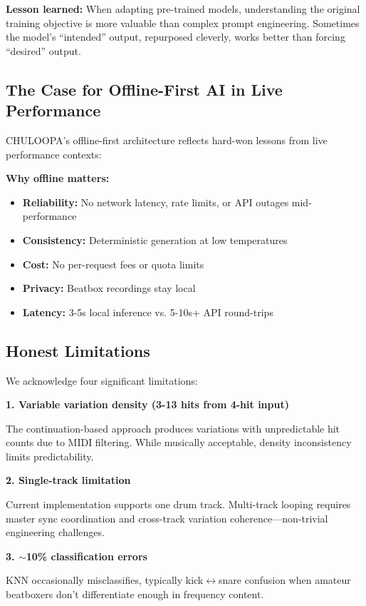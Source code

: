 \documentclass{aimc2026}
\begin{document}
\textbf{Lesson learned:} When adapting pre-trained models, understanding the original training objective is more valuable than complex prompt engineering. Sometimes the model's ``intended'' output, repurposed cleverly, works better than forcing ``desired'' output.

\subsection{The Case for Offline-First AI in Live Performance}

CHULOOPA's offline-first architecture reflects hard-won lessons from live performance contexts:

\textbf{Why offline matters:}
\begin{itemize}
\item \textbf{Reliability:} No network latency, rate limits, or API outages mid-performance
\item \textbf{Consistency:} Deterministic generation at low temperatures
\item \textbf{Cost:} No per-request fees or quota limits
\item \textbf{Privacy:} Beatbox recordings stay local
\item \textbf{Latency:} 3-5s local inference vs. 5-10s+ API round-trips
\end{itemize}

\subsection{Honest Limitations}

We acknowledge four significant limitations:

\textbf{1. Variable variation density (3-13 hits from 4-hit input)}

The continuation-based approach produces variations with unpredictable hit counts due to MIDI filtering. While musically acceptable, density inconsistency limits predictability.

\textbf{2. Single-track limitation}

Current implementation supports one drum track. Multi-track looping requires master sync coordination and cross-track variation coherence---non-trivial engineering challenges.

\textbf{3. $\sim$10\% classification errors}

KNN occasionally misclassifies, typically kick$\leftrightarrow$snare confusion when amateur beatboxers don't differentiate enough in frequency content.
\end{document}
